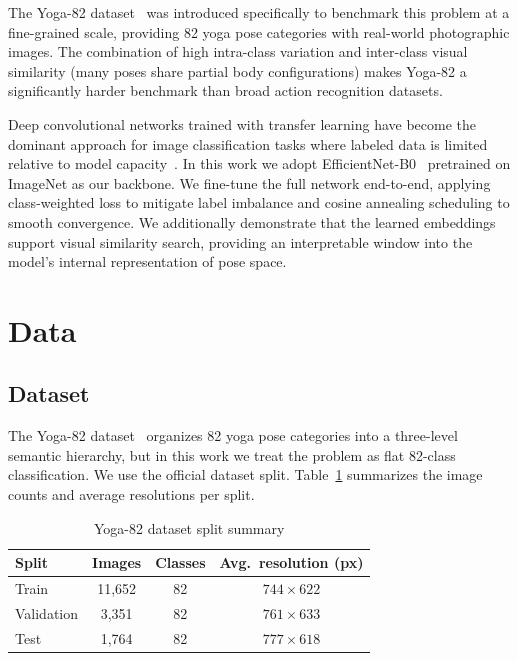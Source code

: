 \documentclass[conference]{IEEEtran}
\begin{document}
The Yoga-82 dataset~\cite{verma2020yoga} was introduced specifically to benchmark this problem at a fine-grained scale, providing 82 yoga pose categories with real-world photographic images. The combination of high intra-class variation and inter-class visual similarity (many poses share partial body configurations) makes Yoga-82 a significantly harder benchmark than broad action recognition datasets.

Deep convolutional networks trained with transfer learning have become the dominant approach for image classification tasks where labeled data is limited relative to model capacity~\cite{lecun2015deep}. In this work we adopt EfficientNet-B0~\cite{tan2019efficientnet} pretrained on ImageNet as our backbone. We fine-tune the full network end-to-end, applying class-weighted loss to mitigate label imbalance and cosine annealing scheduling to smooth convergence. We additionally demonstrate that the learned embeddings support visual similarity search, providing an interpretable window into the model's internal representation of pose space.


\section{Data}

\subsection{Dataset}

The Yoga-82 dataset~\cite{verma2020yoga} organizes 82 yoga pose categories into a three-level semantic hierarchy, but in this work we treat the problem as flat 82-class classification. We use the official dataset split. Table~\ref{tab:dataset} summarizes the image counts and average resolutions per split.

\begin{table}[htbp]
\caption{Yoga-82 dataset split summary}
\begin{center}
\begin{tabular}{|l|c|c|c|}
\hline
\textbf{Split} & \textbf{Images} & \textbf{Classes} & \textbf{Avg.\ resolution (px)} \\
\hline
Train      & 11{,}652 & 82 & $744 \times 622$ \\
Validation &  3{,}351 & 82 & $761 \times 633$ \\
Test       &  1{,}764 & 82 & $777 \times 618$ \\
\hline
\end{tabular}
\label{tab:dataset}
\end{center}
\end{table}
\end{document}
